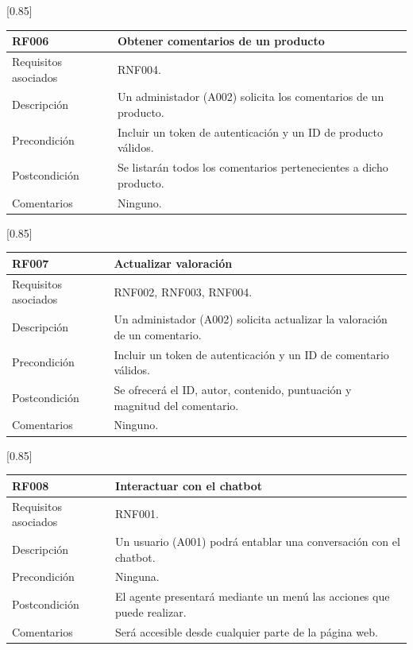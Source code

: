\begin{table}[htbp]
  \centering
  \scalebox{0.85}[0.85] {
    \begin{tabular}{l p{32.145em}}
    \toprule
    \textbf{RF006} & \textbf{Obtener comentarios de un producto} \\
    \midrule
    Requisitos asociados & RNF004. \\
    Descripción & Un administador (A002) solicita los comentarios de un producto. \\
    Precondición & Incluir un token de autenticación y un ID de producto válidos. \\
    Postcondición & Se listarán todos los comentarios pertenecientes a dicho producto. \\
    Comentarios & Ninguno. \\
    \midrule
    \end{tabular}%
  }
  \label{tab:rf006}
\end{table}%

\newpage

\begin{table}[htbp]
  \centering
  \scalebox{0.85}[0.85] {
    \begin{tabular}{l p{32.145em}}
    \toprule
    \textbf{RF007} & \textbf{Actualizar valoración} \\
    \midrule
    Requisitos asociados & RNF002, RNF003, RNF004. \\
    Descripción & Un administador (A002) solicita actualizar la valoración de un comentario. \\
    Precondición & Incluir un token de autenticación y un ID de comentario válidos. \\
    Postcondición & Se ofrecerá el ID, autor, contenido, puntuación y magnitud del comentario. \\
    Comentarios & Ninguno. \\
    \midrule
    \end{tabular}%
 }
  \label{tab:rf007}
\end{table}%

\begin{table}[!htbp]
  \centering
  \scalebox{0.85}[0.85] {
    \begin{tabular}{l p{32.145em}}
    \toprule
    \textbf{RF008} & \textbf{Interactuar con el chatbot} \\
    \midrule
    Requisitos asociados & RNF001. \\
    Descripción & Un usuario (A001) podrá entablar una conversación con el chatbot. \\
    Precondición & Ninguna. \\
    Postcondición & El agente presentará mediante un menú las acciones que puede realizar.\\
    Comentarios & Será accesible desde cualquier parte de la página web. \\
    \midrule
    \end{tabular}%
 }
  \label{tab:rf008}
\end{table}%

